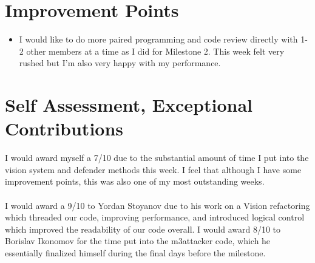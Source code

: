 \documentclass[a4paper,11pt]{article}
\begin{document}

\section{Improvement Points}

\begin{itemize}
\item I would like to do more paired programming and code review directly with 1-2 other members at a time as I did for Milestone 2. This week felt very rushed but I'm also very happy with my performance.
\end{itemize}


\section{Self Assessment, Exceptional Contributions}

I would award myself a 7/10 due to the substantial amount of time I put into the vision system and defender methods this week. I feel that although I have some improvement points, this was also one of my most outstanding weeks.\\
\\
I would award a 9/10 to Yordan Stoyanov due to his work on a Vision refactoring which threaded our code, improving performance, and introduced logical control which improved the readability of our code overall. I would award 8/10 to Borislav Ikonomov for the time put into the m3attacker code, which he essentially finalized himself during the final days before the milestone.


\end{document}
